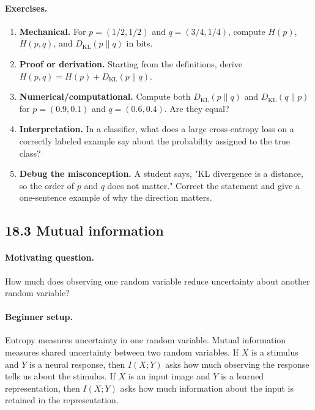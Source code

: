 \paragraph{Exercises.}
\begin{enumerate}[label=\textbf{18.2.\arabic*.}, leftmargin=*]
\item \textbf{Mechanical.} For \(p=(1/2,1/2)\) and \(q=(3/4,1/4)\), compute \(H(p)\), \(H(p,q)\), and \(D_{\mathrm{KL}}(p\|q)\) in bits.
\item \textbf{Proof or derivation.} Starting from the definitions, derive \(H(p,q)=H(p)+D_{\mathrm{KL}}(p\|q)\).
\item \textbf{Numerical/computational.} Compute both \(D_{\mathrm{KL}}(p\|q)\) and \(D_{\mathrm{KL}}(q\|p)\) for \(p=(0.9,0.1)\) and \(q=(0.6,0.4)\). Are they equal?
\item \textbf{Interpretation.} In a classifier, what does a large cross-entropy loss on a correctly labeled example say about the probability assigned to the true class?
\item \textbf{Debug the misconception.} A student says, "KL divergence is a distance, so the order of \(p\) and \(q\) does not matter." Correct the statement and give a one-sentence example of why the direction matters.
\end{enumerate}

\subsection{18.3 Mutual information}

\paragraph{Motivating question.}
How much does observing one random variable reduce uncertainty about another random variable?

\paragraph{Beginner setup.}
Entropy measures uncertainty in one random variable. Mutual information measures shared uncertainty between two random variables. If \(X\) is a stimulus and \(Y\) is a neural response, then \(I(X;Y)\) asks how much observing the response tells us about the stimulus. If \(X\) is an input image and \(Y\) is a learned representation, then \(I(X;Y)\) asks how much information about the input is retained in the representation.

